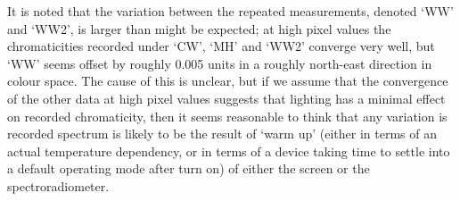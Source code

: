 It is noted that the variation between the repeated measurements, denoted `WW' and `WW2', is larger than might be expected; at high pixel values the chromaticities recorded under `CW', `MH' and `WW2' converge very well, but `WW' seems offset by roughly 0.005 units in a roughly north-east direction%
in colour space. The cause of this is unclear, but if we assume that the convergence of the other data at high pixel values suggests that lighting has a minimal effect on recorded chromaticity, then it seems reasonable to think that any variation is recorded spectrum is likely to be the result of `warm up' (either in terms of an actual temperature dependency, or in terms of a device taking time to settle into a default operating mode after turn on) of either the screen or the spectroradiometer. 







